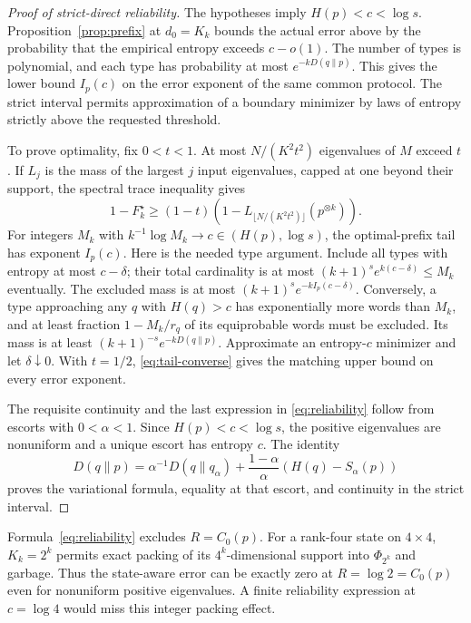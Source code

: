 \begin{proof}[Proof of strict-direct reliability]
The hypotheses imply $H(p)<c<\log s$. Proposition~\ref{prop:prefix} at $d_0=K_k$ bounds the actual error above by the probability that the empirical entropy exceeds $c-o(1)$. The number of types is polynomial, and each type has probability at most $e^{-kD(q\|p)}$. This gives the lower bound $I_p(c)$ on the error exponent of the same common protocol. The strict interval permits approximation of a boundary minimizer by laws of entropy strictly above the requested threshold.

To prove optimality, fix $0<t<1$. At most $N/(K^2t^2)$ eigenvalues of $M$ exceed $t$. If $L_j$ is the mass of the largest $j$ input eigenvalues, capped at one beyond their support, the spectral trace inequality gives
\begin{equation}\label{eq:tail-converse}
 1-F_k^\star\ge(1-t)
 \left(1-L_{\lfloor N/(K^2t^2)\rfloor}(p^{\otimes k})\right).
\end{equation}
For integers $M_k$ with $k^{-1}\log M_k\to c\in(H(p),\log s)$, the optimal-prefix tail has exponent $I_p(c)$. Here is the needed type argument. Include all types with entropy at most $c-\delta$; their total cardinality is at most $(k+1)^s e^{k(c-\delta)}\le M_k$ eventually. The excluded mass is at most $(k+1)^s e^{-kI_p(c-\delta)}$. Conversely, a type approaching any $q$ with $H(q)>c$ has exponentially more words than $M_k$, and at least fraction $1-M_k/r_q$ of its equiprobable words must be excluded. Its mass is at least $(k+1)^{-s}e^{-kD(q\|p)}$. Approximate an entropy-$c$ minimizer and let $\delta\downarrow0$. With $t=1/2$, \eqref{eq:tail-converse} gives the matching upper bound on every error exponent.

The requisite continuity and the last expression in \eqref{eq:reliability} follow from escorts with $0<\alpha<1$. Since $H(p)<c<\log s$, the positive eigenvalues are nonuniform and a unique escort has entropy $c$. The identity
\[
 D(q\|p)=\alpha^{-1}D(q\|q_\alpha)
 +\frac{1-\alpha}{\alpha}(H(q)-S_\alpha(p))
\]
proves the variational formula, equality at that escort, and continuity in the strict interval.
\end{proof}

\begin{remark}
Formula~\eqref{eq:reliability} excludes $R=C_0(p)$. For a rank-four state on $4\times4$, $K_k=2^k$ permits exact packing of its $4^k$-dimensional support into $\Phi_{2^k}$ and garbage. Thus the state-aware error can be exactly zero at $R=\log2=C_0(p)$ even for nonuniform positive eigenvalues. A finite reliability expression at $c=\log4$ would miss this integer packing effect.
\end{remark}

